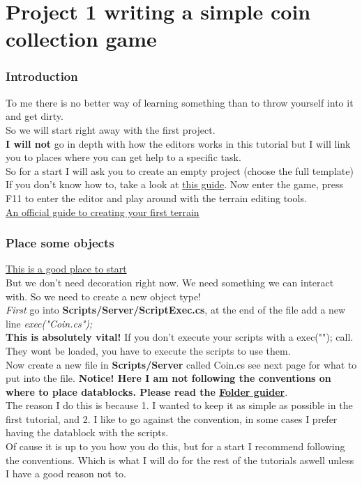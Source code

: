 \section{Project 1 writing a simple coin collection game}
\begin{frame}
	\frametitle{Introduction}
	To me there is no better way of learning something than to throw yourself into it and get dirty.\\
	So we will start right away with the first project.\\
	{\bf I will not} go in depth with how the editors works in this tutorial but I will link you to places where you can get help to a specific task.\\
	So for a start I will ask you to create an empty project (choose the full template)\\
	If you don't know how to, take a look at {\color{blue} \href{http://garagegames.com/products/torque-3d/guides}{this guide}}.
	Now enter the game, press F11 to enter the editor and play around with the terrain editing tools.\\
	{\color{blue}\href{http://vimeo.com/album/223321/video/11629485}{An official guide to creating your first terrain}}
\end{frame}

\begin{frame}
\frametitle{Place some objects}
	{\color{blue} \href{http://vimeo.com/album/223321/video/11630022}{This is a good place to start}}\\
	But we don't need decoration right now. We need something we can interact with. So we need to create a new object type!\\
	{\it First} go into {\bf Scripts/Server/ScriptExec.cs}, at the end of the file add a new line {\it exec("Coin.cs");}\\
	{\bf This is absolutely vital!} If you don't execute your scripts  with a exec(""); call. They wont be loaded, you have to execute the scripts to use them.\\
	Now create a new file in {\bf Scripts/Server} called Coin.cs see next page for what to put into the file.
	{\bf Notice! Here I am not following the conventions on where to place datablocks. Please read the {\color{blue}\hyperlink{QG-Folder}{Folder guider}}}.\\
	The reason I do this is because 1. I wanted to keep it as simple as possible in the first tutorial, and 2. I like to go against the convention, in some cases
	I prefer having the datablock with the scripts.\\
	Of cause it is up to you how you do this, but for a start I recommend following the conventions. Which is what I will do for the rest of the tutorials aswell unless I have
	a good reason not to.
\end{frame}
